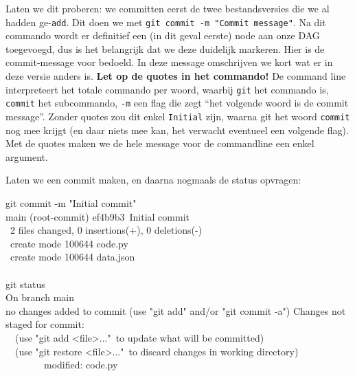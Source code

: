 Laten we dit proberen: we committen eerst de twee bestandsversies die we al hadden ge-\texttt{add}. Dit doen we met \texttt{git commit -m "Commit message"}. Na dit commando wordt er definitief een (in dit geval eerste) node aan onze DAG toegevoegd, dus is het belangrijk dat we deze duidelijk markeren. Hier is de commit-message voor bedoeld. In deze message omschrijven we kort wat er in deze versie anders is. \textbf{Let op de quotes in het commando!} De command line interpreteert het totale commando per woord, waarbij \texttt{git} het commando is, \texttt{commit} het subcommando, \texttt{-m} een flag die zegt \enquote{het volgende woord is de commit message}. Zonder quotes zou dit enkel \texttt{Initial} zijn, waarna git het woord \texttt{commit} nog mee krijgt (en daar niets mee kan, het verwacht eventueel een volgende flag). Met de quotes maken we de hele message voor de commandline een enkel argument.

Laten we een commit maken, en daarna nogmaals de status opvragen:

\begin{bash}
 git commit -m "Initial commit"\\
\lbrack main (root-commit) ef4b9b3\rbrack\ Initial commit\\
\ 2 files changed, 0 insertions(+), 0 deletions(-)\\
\ create mode 100644 code.py\\
\ create mode 100644 data.json\\
~ \\
 git status\\
On branch main
~ \\
no changes added to commit (use "git add" and/or "git commit -a")
Changes not staged for commit:\\
\ \ (use "git add <file>..."\ to update what will be committed)\\
\ \ (use "git restore <file>..."\ to discard changes in working directory)\\
\ \ \ \ \ \ \ \ {\color{ttred}modified:   code.py}\\
\end{bash}

